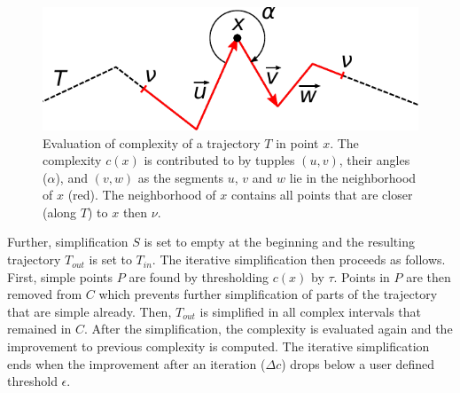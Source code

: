 \begin{figure}
	\includegraphics[width=0.95\linewidth]{img/complexity.pdf}
\caption{Evaluation of complexity of a trajectory $T$ in point $x$.
The complexity $c(x)$ is contributed to by tupples $(u, v)$, \ie their angles ($\alpha$), and $(v, w)$ as the segments $u$, $v$ and $w$ lie in the neighborhood of $x$ (red).
The neighborhood of $x$ contains all points that are closer (along $T$) to $x$ then $\nu$.}
\label{fig:complexity}
\end{figure}

Further, simplification $S$ is set to empty at the beginning and the resulting trajectory $T_{out}$ is set to $T_{in}$.
The iterative simplification then proceeds as follows.
First, simple points $P$ are found by thresholding $c(x)$ by $\tau$.
Points in $P$ are then removed from $C$ which prevents further simplification of parts of the trajectory that are simple already.
Then, $T_{out}$ is simplified in all complex intervals that remained in $C$.
After the simplification, the complexity is evaluated again and the improvement to previous complexity is computed.
The iterative simplification ends when the improvement after an iteration ($\Delta c$) drops below a user defined threshold $\epsilon$.
